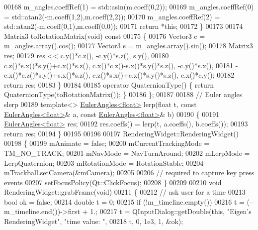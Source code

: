 \begin{DoxyCode}
00168     m\_angles.coeffRef(1) = std::asin(m.coeff(0,2));
00169     m\_angles.coeffRef(0) = std::atan2(-m.coeff(1,2),m.coeff(2,2));
00170     m\_angles.coeffRef(2) = std::atan2(-m.coeff(0,1),m.coeff(0,0));
00171     \textcolor{keywordflow}{return} *\textcolor{keyword}{this};
00172   \}
00173 
00174   Matrix3 toRotationMatrix(\textcolor{keywordtype}{void})\textcolor{keyword}{ const}
00175 \textcolor{keyword}{  }\{
00176     Vector3 c = m\_angles.array().cos();
00177     Vector3 s = m\_angles.array().sin();
00178     Matrix3 res;
00179     res <<  c.y()*c.z(),                    -c.y()*s.z(),                   s.y(),
00180             c.z()*s.x()*s.y()+c.x()*s.z(),  c.x()*c.z()-s.x()*s.y()*s.z(),  -c.y()*s.x(),
00181             -c.x()*c.z()*s.y()+s.x()*s.z(), c.z()*s.x()+c.x()*s.y()*s.z(),  c.x()*c.y();
00182     \textcolor{keywordflow}{return} res;
00183   \}
00184 
00185   \textcolor{keyword}{operator} QuaternionType() \{ \textcolor{keywordflow}{return} QuaternionType(toRotationMatrix()); \}
00186 \};
00187 
00188 \textcolor{comment}{// Euler angles slerp}
00189 \textcolor{keyword}{template}<> \hyperlink{class_eigen_1_1_euler_angles}{EulerAngles<float>} lerp(\textcolor{keywordtype}{float} t, \textcolor{keyword}{const} 
      \hyperlink{class_eigen_1_1_euler_angles}{EulerAngles<float>}& a, \textcolor{keyword}{const} \hyperlink{class_eigen_1_1_euler_angles}{EulerAngles<float>}& b)
00190 \{
00191   \hyperlink{class_eigen_1_1_euler_angles}{EulerAngles<float>} res;
00192   res.coeffs() = lerp(t, a.coeffs(), b.coeffs());
00193   \textcolor{keywordflow}{return} res;
00194 \}
00195 
00196 
00197 RenderingWidget::RenderingWidget()
00198 \{
00199   mAnimate = \textcolor{keyword}{false};
00200   mCurrentTrackingMode = TM\_NO\_TRACK;
00201   mNavMode = NavTurnAround;
00202   mLerpMode = LerpQuaternion;
00203   mRotationMode = RotationStable;
00204   mTrackball.setCamera(&mCamera);
00205 
00206   \textcolor{comment}{// required to capture key press events}
00207   setFocusPolicy(Qt::ClickFocus);
00208 \}
00209 
00210 \textcolor{keywordtype}{void} RenderingWidget::grabFrame(\textcolor{keywordtype}{void})
00211 \{
00212     \textcolor{comment}{// ask user for a time}
00213     \textcolor{keywordtype}{bool} ok = \textcolor{keyword}{false};
00214     \textcolor{keywordtype}{double} t = 0;
00215     \textcolor{keywordflow}{if} (!m\_timeline.empty())
00216       t = (--m\_timeline.end())->first + 1.;
00217     t = QInputDialog::getDouble(\textcolor{keyword}{this}, \textcolor{stringliteral}{"Eigen's RenderingWidget"}, \textcolor{stringliteral}{"time value: "},
00218       t, 0, 1e3, 1, &ok);

\end{DoxyCode}
